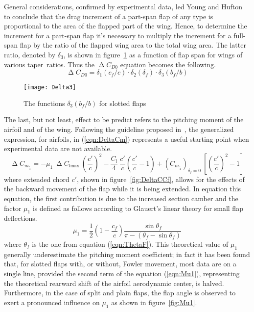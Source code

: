 \bigskip
\noindent
General considerations, confirmed by experimental data, led Young and Hufton to conclude that the drag increment of a part-span flap of any type is proportional to the area of the flapped part of the wing.
%
\noindent
Hence, to determine the increment for a part-span flap it's necessary to multiply the increment for a full-span flap by the ratio of the flapped wing area to the total wing area. The latter ratio, denoted by $\delta_3$, is shown in figure~\ref{fig:Delta3} as a function of flap span for wings of various taper~ratios. Thus the $\upDelta C_{D0}$ equation becomes the following.
%
\begin{equation}
\upDelta C_{D0}=\delta_1\left(c_f/c\right)\cdot\delta_2\left(\delta_f\right)\cdot\delta_3\left(b_f/b\right)
\label{eqn:DeltaCD0PartSpan}
\end{equation}
%
\begin{figure}[!t]
\centering
\texttt{[image: Delta3]}
\caption{The functions $\delta_3\left(b_f/b\right)$ for slotted flaps}
\label{fig:Delta3}
\end{figure}
%
The last, but not least, effect to be predict refers to the pitching moment of the airfoil and of the wing. Following the guideline proposed in~\cite{torenbeek1982synthesis}, the generalized expression, for airfoils, in (\ref{eqn:DeltaCm}) represents a useful starting point when experimental data are not available.
%
\begin{equation}
\upDelta C_{m_{\frac{c}{4}}}=-\mu_1\ \upDelta C_{l\text{max}}\ \left(\dfrac{c'}{c}\right)^2-\dfrac{C_l}{4}\ \dfrac{c'}{c}\left(\dfrac{c'}{c}-1\right)+\left(C_{m_{\frac{c}{4}}}\right)_{\delta_f=0}\ \left[\left(\dfrac{c'}{c}\right)^2-1\right]
\label{eqn:DeltaCm}
\end{equation}
%
where extended chord $c'$, shown in figure~\ref{fig:DeltaCCf}, allows for the effects of the backward movement of the flap while it is being extended.
%
In equation this equation, the first contribution is due to the increased section camber and the factor $\mu_1$ is defined as follows according to Glauert's linear theory for small flap deflections.
%
\begin{equation}
\mu_1=\dfrac{1}{2}\left(1-\dfrac{c_f}{c}\right)\dfrac{\sin\theta_f}{\pi-\left(\theta_f-\sin\theta_f\right)}
\label{eqn:Mu1}
\end{equation}
%
where $\theta_f$ is the one from equation (\ref{eqn:ThetaF}). This theoretical value of $\mu_1$ generally underestimate the pitching moment coefficient; in fact it has been found that, for slotted flaps with, or without, Fowler movement, most data are on a single line, provided the second term of the equation (\ref{eqn:Mu1}), representing the theoretical rearward shift of the airfoil aerodynamic center, is halved. Furthermore, in the case of split and plain flaps, the flap angle is observed to exert a pronounced influence on $\mu_1$ as shown in figure~\ref{fig:Mu1}.
